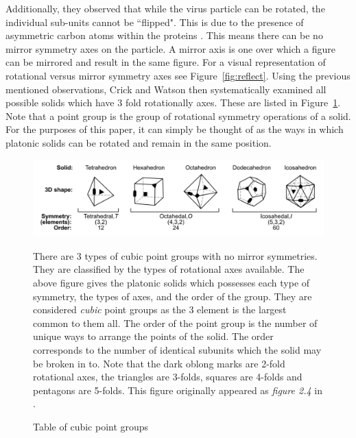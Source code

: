 \documentclass[12pt,letter]{article}
\begin{document}
Additionally, they observed that while the virus particle can be rotated, the individual sub-units cannot be ``flipped". This is due to the presence of asymmetric carbon atoms within the proteins \cite[p 474]{Crick:1956}. This means there can be no mirror symmetry axes on the particle. A mirror axis is one over which a figure can be mirrored and result in the same figure. For a visual representation of rotational versus mirror symmetry axes see Figure~\ref{fig:reflect}. Using the previous mentioned observations, Crick and Watson then systematically examined all possible solids which have 3 fold rotationally axes. These are listed in Figure~\ref{table:cubic_groups}. Note that a point group is the group of rotational symmetry operations of a solid. For the purposes of this paper, it can simply be thought of as the ways in which platonic solids can be rotated and remain in the same position.

\begin{figure}[t!]
	\caption{Table of cubic point groups}
	\centering
	\includegraphics[width = .95\textwidth]{point_groups.pdf}
	\label{table:cubic_groups}
	\begin{minipage}[h]{.85\textwidth}
		\begin{footnotesize}
			There are 3 types of cubic point groups with no mirror symmetries. They are classified by the types of rotational axes available. The above figure gives the platonic solids which possesses each type of symmetry, the types of axes, and the order of the group. They are considered \textit{cubic} point groups as the 3 element is the largest common to them all. The order of the point group is the number of unique ways to arrange the points of the solid. The order corresponds to the number of identical subunits which the solid may be broken in to. Note that the dark oblong marks are 2-fold rotational axes, the triangles are 3-folds, squares are 4-folds and pentagons are 5-folds. This figure originally appeared as \textit{figure 2.4} in \cite{Mannige:Thesis}.
		\end{footnotesize}
	\end{minipage}
\end{figure}
\end{document}
